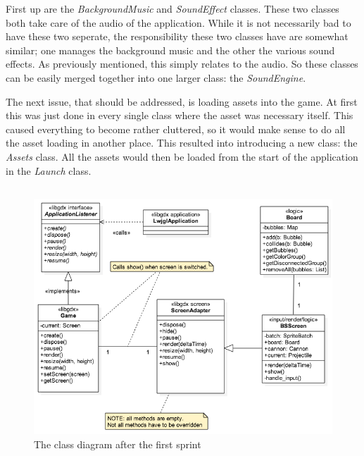 \documentclass[a4paper,11pt]{article}
\begin{document}
First up are the \textit{BackgroundMusic} and \textit{SoundEffect} classes. These two classes both take care of the audio of the application. While it is not necessarily bad to have these two seperate, the responsibility these two classes have are somewhat similar; one manages the background music and the other the various sound effects. As previously mentioned, this simply relates to the audio. So these classes can be easily merged together into one larger class: the \textit{SoundEngine}.

The next issue, that should be addressed, is loading assets into the game. At first this was just done in every single class where the asset was necessary itself. This caused everything to become rather cluttered, so it would make sense to do all the asset loading in another place. This resulted into introducing a new class: the \textit{Assets} class. All the assets would then be loaded from the start of the application in the \textit{Launch} class.
 \newpage
\subsection{}
\begin{figure}[h]
\includegraphics[width=\textwidth]{old_class_diagram}
\caption{The class diagram after the first sprint}
\end{figure}
\newpage
\end{document}
